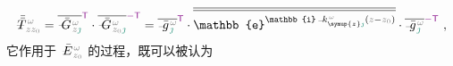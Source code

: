 \begin{align} \label{eq:transition_matrix}
	\xint{\mathcolor{gray}{-}}{32}{\bar{\bar{T}}}^{\;\!\mathcolor{gray}{\omega}}_{\;\! \mathcolor{gray}{z} \mathcolor{gray}{z_0}} = \overline{\xint{\mathcolor{gray}{-}}{20}{\bar{G}}^{\;\!\mathcolor{gray}{\omega}}_{\;\! \mathcolor{gray}{z} \textcolor{PineGreen}{\jmath}}}^{\mathsf{\textcolor{Plum}{T}}} \cdot \overline{\xint{\mathcolor{gray}{-}}{20}{\bar{G}}^{\;\!\mathcolor{gray}{\omega}}_{\;\! \mathcolor{gray}{z_0} \textcolor{PineGreen}{\jmath}}}^{\textcolor{Plum}{-\mathsf{T}}} = \overline{\xint{{}^{}_{\mathcolor{gray}{-}}}{10}{\bar{g}}^{\;\!\mathcolor{gray}{\omega}}_{\;\! \textcolor{PineGreen}{\jmath}}}^{\mathsf{\textcolor{Plum}{T}}} \cdot \overline{\overline{\mathbb{e}^{\mathbb{i} \xint{\begin{smallmatrix} ~ \\ {}^{}_{\mathcolor{gray}{-}} \\ ~ \end{smallmatrix}}{15}{k}_{\symup{z} \textcolor{PineGreen}{\jmath}}^{\;\! \mathcolor{gray}{\omega}} \left( \mathcolor{gray}{z} - \mathcolor{gray}{z_0} \right)}}} \cdot \overline{\xint{{}^{}_{\mathcolor{gray}{-}}}{10}{\bar{g}}^{\;\!\mathcolor{gray}{\omega}}_{\;\! \textcolor{PineGreen}{\jmath}}}^{\textcolor{Plum}{-\mathsf{T}}} ~,
\end{align}
它作用于 $\xint{\mathcolor{gray}{-}}{25}{\bar{E}}^{\;\!\mathcolor{gray}{\omega}}_{\;\! \mathcolor{gray}{z_0}}$ 的过程，既可以被认为
